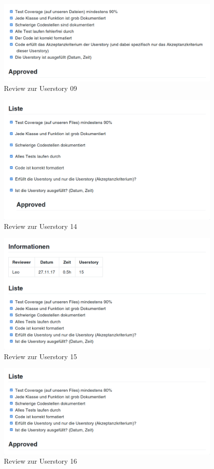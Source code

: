 \documentclass[accentcolor=tud9c,12pt,paper=a4]{tudreport}
\begin{document}
\begin{figure}[H]
\centering
\includegraphics[width=.8\textwidth]{code_review/us09}
\caption{Review zur Userstory 09}
\end{figure}

\begin{figure}[H]
\centering
\includegraphics[width=.8\textwidth]{code_review/us14}
\caption{Review zur Userstory 14}
\end{figure}

\begin{figure}[H]
\centering
\includegraphics[width=.8\textwidth]{code_review/us15}
\caption{Review zur Userstory 15}
\end{figure}

\begin{figure}[H]
\centering
\includegraphics[width=.8\textwidth]{code_review/us16}
\caption{Review zur Userstory 16}
\end{figure}
\end{document}
